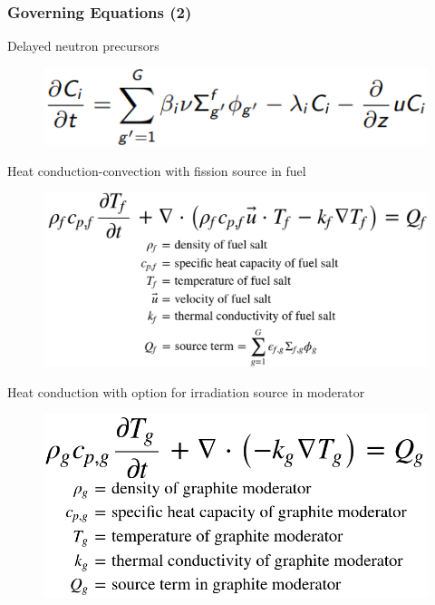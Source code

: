 \begin{frame}
  \frametitle{Governing Equations (2)}
     \begin{block}{Delayed neutron precursors}
               \begin{figure}[t]
                 \vspace*{-0.05in}
                \includegraphics[height=0.09\textwidth]{./images/delayed_neutrons.png}
               \end{figure}   
     \end{block}
     
     \begin{block}{Heat conduction-convection with fission source in fuel}
              \begin{figure}[t]
                 \vspace*{-0.05in}
                \includegraphics[height=0.23\textwidth]{./images/fuel_temp.png}
               \end{figure}        
	\end{block}
	
     \begin{block}{Heat conduction with option for irradiation source in moderator}
              \begin{figure}[t]
                 \vspace*{-0.05in}
                 \includegraphics[height=0.2\textwidth]{./images/moder_temp.png}
               \end{figure}        
	\end{block}
\end{frame}

